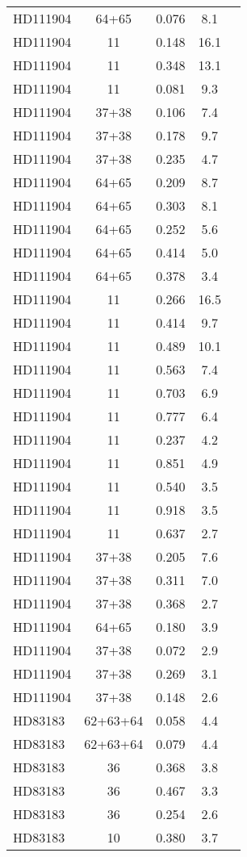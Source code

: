 \begin{table*}
\begin{tabular}{l c c c c}
HD111904 & 64+65 & 0.076 & 8.1\\ 
HD111904 & 11 & 0.148 & 16.1\\ 
HD111904 & 11 & 0.348 & 13.1\\ 
HD111904 & 11 & 0.081 & 9.3\\ 
HD111904 & 37+38 & 0.106 & 7.4\\ 
HD111904 & 37+38 & 0.178 & 9.7\\ 
HD111904 & 37+38 & 0.235 & 4.7\\ 
HD111904 & 64+65 & 0.209 & 8.7\\ 
HD111904 & 64+65 & 0.303 & 8.1\\ 
HD111904 & 64+65 & 0.252 & 5.6\\ 
HD111904 & 64+65 & 0.414 & 5.0\\ 
HD111904 & 64+65 & 0.378 & 3.4\\ 
HD111904 & 11 & 0.266 & 16.5\\ 
HD111904 & 11 & 0.414 & 9.7\\ 
HD111904 & 11 & 0.489 & 10.1\\ 
HD111904 & 11 & 0.563 & 7.4\\ 
HD111904 & 11 & 0.703 & 6.9\\ 
HD111904 & 11 & 0.777 & 6.4\\ 
HD111904 & 11 & 0.237 & 4.2\\ 
HD111904 & 11 & 0.851 & 4.9\\ 
HD111904 & 11 & 0.540 & 3.5\\ 
HD111904 & 11 & 0.918 & 3.5\\ 
HD111904 & 11 & 0.637 & 2.7\\ 
HD111904 & 37+38 & 0.205 & 7.6\\ 
HD111904 & 37+38 & 0.311 & 7.0\\ 
HD111904 & 37+38 & 0.368 & 2.7\\ 
HD111904 & 64+65 & 0.180 & 3.9\\ 
HD111904 & 37+38 & 0.072 & 2.9\\ 
HD111904 & 37+38 & 0.269 & 3.1\\ 
HD111904 & 37+38 & 0.148 & 2.6\\ 
\hline
HD83183 & 62+63+64 & 0.058 & 4.4\\ 
HD83183 & 62+63+64 & 0.079 & 4.4\\ 
HD83183 & 36 & 0.368 & 3.8\\ 
HD83183 & 36 & 0.467 & 3.3\\ 
HD83183 & 36 & 0.254 & 2.6\\ 
HD83183 & 10 & 0.380 & 3.7\\ 

\end{tabular}
\end{table*}
